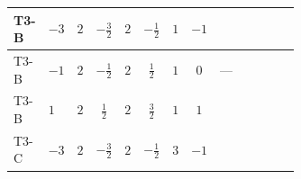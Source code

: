\documentclass[8pt]{article}
\begin{document}
\begin{landscape}
\begin{longtable}{@{}llcccccc >{\raggedright\arraybackslash}p{0.21\linewidth} >{\raggedright\arraybackslash}p{0.21\linewidth} >{\raggedright\arraybackslash}p{0.21\linewidth}@{}}
\midrule
T3-B & $-3$ & $2$ & $-\frac{3}{2}$ & $2$ & $-\frac{1}{2}$ & $1$ & $-1$ & \scriptsize\adjustbox{max width=\linewidth}{$\begin{gathered} +{g_1}^2 \left(18 {g_2}^2-15 {\lambda_{12}^{(A)}}\right)\end{gathered}$} & \scriptsize\adjustbox{max width=\linewidth}{$\begin{gathered} -9 {g_2}^2 {\lambda_{12}^{(A)}}\end{gathered}$} & \scriptsize\adjustbox{max width=\linewidth}{$\begin{gathered} +8 {\lambda_{12}^{(1)}} {\lambda_{12}^{(A)}}\end{gathered}$} \\
\midrule
T3-B & $-1$ & $2$ & $-\frac{1}{2}$ & $2$ & $\frac{1}{2}$ & $1$ & $0$ & --- & \scriptsize\adjustbox{max width=\linewidth}{$\begin{gathered} -9 {g_2}^2 {\lambda_{12}^{(A)}}\end{gathered}$} & \scriptsize\adjustbox{max width=\linewidth}{$\begin{gathered} +8 {\lambda_{12}^{(1)}} {\lambda_{12}^{(A)}}\end{gathered}$} \\
\midrule
T3-B & $1$ & $2$ & $\frac{1}{2}$ & $2$ & $\frac{3}{2}$ & $1$ & $1$ & \scriptsize\adjustbox{max width=\linewidth}{$\begin{gathered} +{g_1}^2 \left(18 {g_2}^2-15 {\lambda_{12}^{(A)}}\right)\end{gathered}$} & \scriptsize\adjustbox{max width=\linewidth}{$\begin{gathered} -9 {g_2}^2 {\lambda_{12}^{(A)}}\end{gathered}$} & \scriptsize\adjustbox{max width=\linewidth}{$\begin{gathered} +8 {\lambda_{12}^{(1)}} {\lambda_{12}^{(A)}}\end{gathered}$} \\
\midrule
T3-C & $-3$ & $2$ & $-\frac{3}{2}$ & $2$ & $-\frac{1}{2}$ & $3$ & $-1$ & \scriptsize\adjustbox{max width=\linewidth}{$\begin{gathered} +{g_1}^2 \left(18 {g_2}^2-15 {\lambda_{12}^{(A)}}\right)\end{gathered}$} & \scriptsize\adjustbox{max width=\linewidth}{$\begin{gathered} -9 {g_2}^2 {\lambda_{12}^{(A)}}\end{gathered}$} & \scriptsize\adjustbox{max width=\linewidth}{$\begin{gathered} +8 {\lambda_{12}^{(1)}} {\lambda_{12}^{(A)}}\end{gathered}$} \\

\end{longtable}
\end{landscape}
\end{document}
